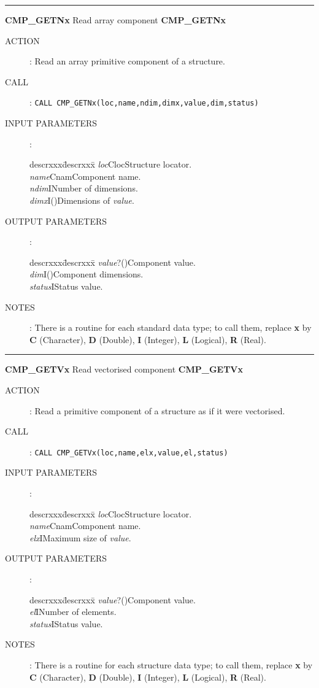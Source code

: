 \goodbreak
\rule{\textwidth}{0.3mm}
{\Large {\bf CMP\_GETNx} \hfill Read array component \hfill {\bf CMP\_GETNx}}
\begin{description}
\item [ACTION]:
Read an array primitive component of a structure.
\item [CALL]:
{\tt CALL CMP\_GETNx(loc,name,ndim,dimx,value,dim,status)}
\item [INPUT PARAMETERS]:
\begin{tabbing}
descrxxx\=descrxxx\=\kill
{\em loc}\>Cloc\>Structure locator.\\
{\em name}\>Cnam\>Component name.\\
{\em ndim}\>I\>Number of dimensions.\\
{\em dimx}\>I()\>Dimensions of {\em value}.
\end{tabbing}
\item [OUTPUT PARAMETERS]:
\begin{tabbing}
descrxxx\=descrxxx\=\kill
{\em value}\>?()\>Component value.\\
{\em dim}\>I()\>Component dimensions.\\
{\em status}\>I\>Status value.
\end{tabbing}
\item [NOTES]:
There is a routine for each standard data type; to call them, replace {\bf x}
by {\bf C} (Character), {\bf D} (Double), {\bf I} (Integer), {\bf L} (Logical),
{\bf R} (Real).
\end{description}
\goodbreak
\rule{\textwidth}{0.3mm}
{\Large {\bf CMP\_GETVx} \hfill Read vectorised component \hfill {\bf CMP\_GETVx}}
\begin{description}
\item [ACTION]:
Read a primitive component of a structure as if it were vectorised.
\item [CALL]:
{\tt CALL CMP\_GETVx(loc,name,elx,value,el,status)}
\item [INPUT PARAMETERS]:
\begin{tabbing}
descrxxx\=descrxxx\=\kill
{\em loc}\>Cloc\>Structure locator.\\
{\em name}\>Cnam\>Component name.\\
{\em elx}\>I\>Maximum size of {\em value}.
\end{tabbing}
\item [OUTPUT PARAMETERS]:
\begin{tabbing}
descrxxx\=descrxxx\=\kill
{\em value}\>?()\>Component value.\\
{\em el}\>I\>Number of elements.\\
{\em status}\>I\>Status value.
\end{tabbing}
\item [NOTES]:
There is a routine for each structure data type; to call them, replace {\bf x}
by {\bf C} (Character), {\bf D} (Double), {\bf I} (Integer), {\bf L} (Logical),
{\bf R} (Real).
\end{description}
